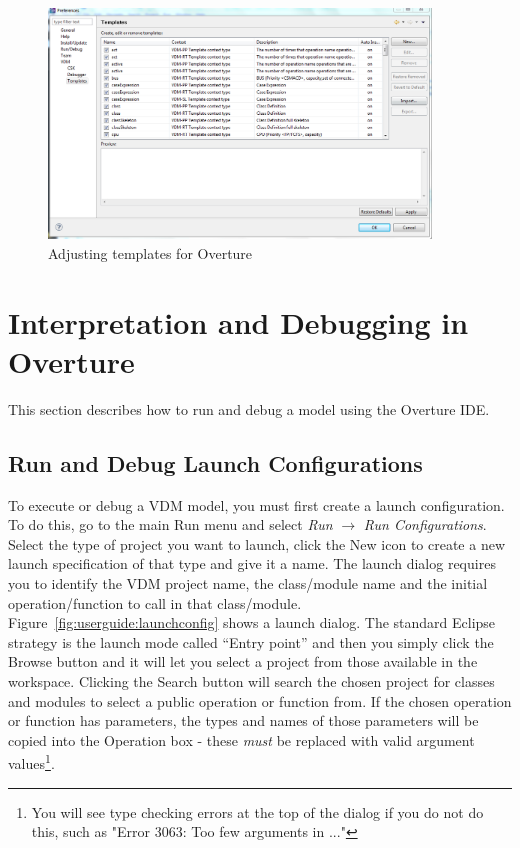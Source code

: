 \documentclass{overturerepchap}
\begin{document}
\begin{figure}
\begin{center}
\includegraphics[width=4in]{screendumps/templatesRT}
\caption{Adjusting templates for Overture}
\label{fig:Templatepreferences}
\end{center}
\end{figure}

\chapter{Interpretation and Debugging in Overture}\label{sec:debug}

This section describes how to run and debug a model using the Overture IDE. 

\section{Run and Debug Launch Configurations}\label{sec:launchmodes}

To execute or debug a VDM model, you must first create a launch
configuration. To do this, go to the main Run menu
and select \emph{Run} $\rightarrow $ \emph{Run Configurations}. Select the type of
project you want to launch, click the New icon to
create a new launch specification of that type and give it a name. The
launch dialog requires you to identify the VDM project name,
the class/module name and the initial operation/function to call in that
class/module. Figure~\ref{fig:userguide:launchconfig} shows a launch
dialog. The standard Eclipse strategy is the launch mode called
``Entry point'' and then you simply click 
the Browse button and it will let you select a project from
those available in the workspace. Clicking the Search button will search the chosen
project for classes and modules to select a public operation or function from.
If the chosen operation or function has parameters, the types and names of those
parameters will be copied into the Operation box - these \emph{must} be replaced with
valid argument values\footnote{You will see type checking errors at the top of the
dialog if you do not do this, such as "Error 3063: Too few arguments in ..."}.
\end{document}
